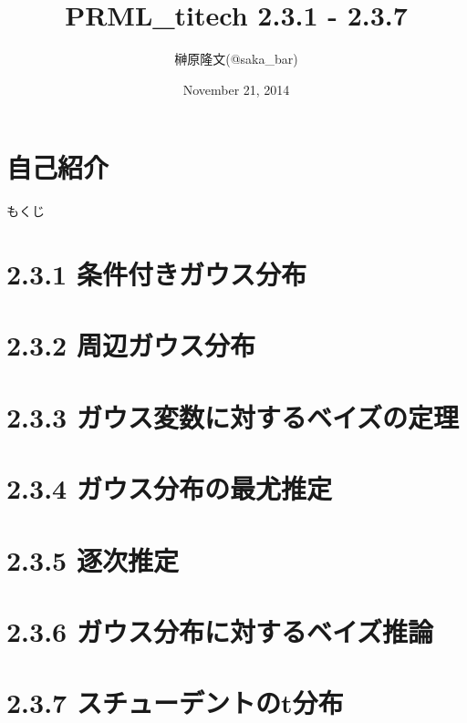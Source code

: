 \documentclass[dvipdfm]{beamer}
\title{PRML\_titech 2.3.1 - 2.3.7}
\author{榊原隆文(@saka\_bar)}
\date{November 21, 2014}
\begin{document}
\maketitle

 \section*{自己紹介}
 

 \begin{frame}{もくじ}
  \tableofcontents
 \end{frame}

 \section{2.3.1 条件付きガウス分布}
 

 \section{2.3.2 周辺ガウス分布}
 

 \section{2.3.3 ガウス変数に対するベイズの定理}
 

 \section{2.3.4 ガウス分布の最尤推定}
 

 \section{2.3.5 逐次推定}
 

 \section{2.3.6 ガウス分布に対するベイズ推論}
 

 \section{2.3.7 スチューデントのt分布}
 
\end{document}
